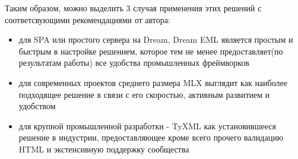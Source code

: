 Таким образом, можно выделить 3 случая применения этих решений с соответсвующими рекомендациями от автора:
\begin{itemize}
    \item для SPA или простого сервера на Dream, Dream EML является простым и быстрым в настройке решением, которое тем не менее предоставляет(по результатам работы) все удобства промышленных фреймворков
    \item для современных проектов среднего размера MLX выглядит как наиболее подходящее решение в связи с его скоростью, активным развитием и удобством
    \item для крупной промышленной разработки - TyXML как установившееся решение в индустрии, предоставляющее кроме всего прочего валидацию HTML и экстенсивную поддержку сообщества
\end{itemize}
